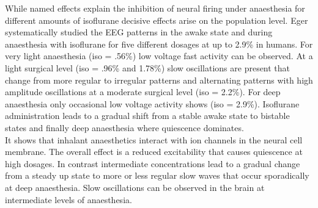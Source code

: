 While named effects explain the inhibition of neural firing under anaesthesia for different amounts of isoflurane decisive effects arise on the population level. Eger \parencite*{eger1981isoflurane} systematically studied the EEG patterns in the awake state and during anaesthesia with isoflurane for five different dosages at up to 2.9\% in humans. For very light anaesthesia (iso = .56\%) low voltage fast activity can be observed. At a light surgical level (iso = .96\% and 1.78\%) slow oscillations are present that change from more regular to irregular patterns and alternating patterns with high amplitude oscillations at a moderate surgical level (iso = 2.2\%). For deep anaesthesia only occasional low voltage activity shows (iso = 2.9\%). Isoflurane administration leads to a gradual shift from a stable awake state to bistable states and finally deep anaesthesia where quiescence dominates.\\
It shows that inhalant anaesthetics interact with ion channels in the neural cell membrane. The overall effect is a reduced excitability that causes quiescence at high dosages. In contrast intermediate concentrations lead to a gradual change from a steady up state to more or less regular slow waves that occur sporadically at deep anaesthesia. Slow oscillations can be observed in the brain at intermediate levels of anaesthesia.
